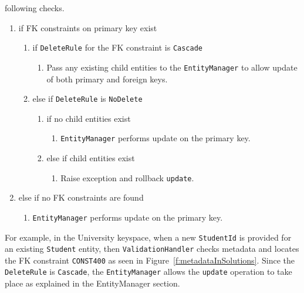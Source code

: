 \begin{description}
\begin{description}
		following checks.
		\renewcommand{\labelenumii}{\arabic{enumi}.\arabic{enumii}}
		\renewcommand{\labelenumiii}{\arabic{enumi}.\arabic{enumii}.\arabic{enumiii}}
		\begin{enumerate}
		  \item if \ac{FK} constraints on primary key exist
		  	\begin{enumerate}		  	
		    \item if \texttt{DeleteRule} for the \ac{FK} constraint is
		    \texttt{Cascade}
		    	\begin{enumerate}
		    	  \item Pass any existing child entities to the \texttt{EntityManager} to
		    	  allow update of both primary and foreign keys.
				\end{enumerate}
			\item else if \texttt{DeleteRule}  is \texttt{NoDelete}
				\begin{enumerate}
				  \item if no child entities exist
				  		\begin{enumerate}
				  		  \item \texttt{EntityManager} performs update on  the primary key.
				  		\end{enumerate}
				  \item else if child entities exist
				   		\begin{enumerate}
				    	\item Raise exception and rollback \texttt{update}. 
				    	\end{enumerate}
				\end{enumerate}
			\end{enumerate}
		  \item else if no \ac{FK} constraints are found 
		  		\begin{enumerate}
		  		  \item \texttt{EntityManager} performs update on the primary key.
				\end{enumerate}
		 \end{enumerate}
		 
		For example,  in the University keyspace,  when a
		new \texttt{StudentId} is provided for an existing  \texttt{Student}
		entity,  then \texttt{ValidationHandler}
		checks metadata and locates the \ac{FK} constraint \texttt{CONST400} as seen in
		Figure~\ref{f:metadataInSolutions}. Since the \texttt{DeleteRule} is
		\texttt{Cascade}, the \texttt{EntityManager} allows the \texttt{update}
		operation to take place as explained in the EntityManager section.
			

\end{description}
\end{description}
